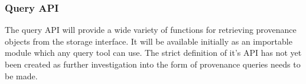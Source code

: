 \subsubsection{Query API}
The query API will provide a wide variety of functions for retrieving provenance objects from the storage interface. It will be available initially as an importable module which any query tool can use. The strict definition of it's API has not yet been created as further investigation into the form of provenance queries needs to be made.
